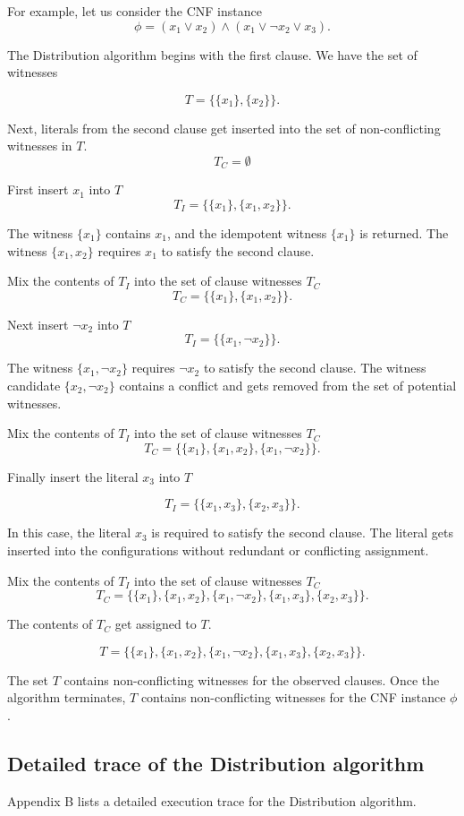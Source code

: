 For example, let us consider the CNF instance
\[
\phi = (x_1 \vee x_2) \wedge (x_1 \vee \neg x_2 \vee x_3).
\]		

The Distribution algorithm begins with the first clause.  We have the set of witnesses

\[
T = \{ \{x_1\}, \{x_2\} \}.
\] 

Next, literals from the second clause get inserted into the set of non-conflicting witnesses in $T$.
\[
T_C = \emptyset
\]

\noindent First insert $x_1$ into $T$
\[
T_I = \{ \{x_1\}, \{x_1, x_2\} \}.
\] 

\noindent The witness $\{x_1\}$ contains $x_1$, and the idempotent witness $\{x_1\}$ is returned.  The witness $\{x_1, x_2\}$ requires $x_1$ to satisfy the second clause.

Mix the contents of $T_I$ into the set of clause witnesses $T_C$
\[
T_C = \{ \{x_1\}, \{x_1, x_2\} \}.
\]

\noindent Next insert $\neg x_2$ into $T$
\[
T_I = \{ \{x_1, \neg x_2\} \}.
\] 

\noindent The witness $\{x_1, \neg x_2\}$ requires $\neg x_2$ to satisfy the second clause.  The witness candidate $\{x_2, \neg x_2\}$ contains a conflict and gets removed from the set of potential witnesses.

Mix the contents of $T_I$ into the set of clause witnesses $T_C$
\[
T_C = \{ \{x_1\}, \{x_1, x_2\}, \{x_1, \neg x_2\} \}.
\]

Finally insert the literal $x_3$ into $T$

\[
T_I = \{ \{x_1, x_3\}, \{x_2, x_3\} \}.
\] 

\noindent In this case, the literal $x_3$ is required to satisfy the second clause.  The literal gets inserted into the configurations without redundant or conflicting assignment.

Mix the contents of $T_I$ into the set of clause witnesses $T_C$
\[
T_C = \{ \{x_1\}, \{x_1, x_2\}, \{x_1, \neg x_2\}, \{x_1, x_3\}, \{x_2, x_3\} \}.
\]

The contents of $T_C$ get assigned to $T$.

\[
T = \{ \{x_1\}, \{x_1, x_2\}, \{x_1, \neg x_2\}, \{x_1, x_3\}, \{x_2, x_3\} \}.
\]

The set $T$ contains non-conflicting witnesses for the observed clauses.  Once the algorithm terminates, $T$ contains non-conflicting witnesses for the CNF instance $\phi$. 
	
	\subsection{Detailed trace of the Distribution algorithm}

Appendix B lists a detailed execution trace for the Distribution algorithm.

%
%
%	
